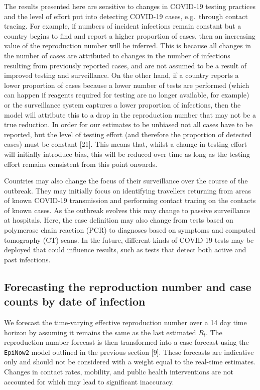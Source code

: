 \documentclass[
]{article}
\begin{document}
The results presented here are sensitive to changes in COVID-19 testing
practices and the level of effort put into detecting COVID-19 cases,
e.g.~through contact tracing. For example, if numbers of incident
infections remain constant but a country begins to find and report a
higher proportion of cases, then an increasing value of the reproduction
number will be inferred. This is because all changes in the number of
cases are attributed to changes in the number of infections resulting
from previously reported cases, and are not assumed to be a result of
improved testing and surveillance. On the other hand, if a country
reports a lower proportion of cases because a lower number of tests are
performed (which can happen if reagents required for testing are no
longer available, for example) or the surveillance system captures a
lower proportion of infections, then the model will attribute this to a
drop in the reproduction number that may not be a true reduction. In
order for our estimates to be unbiased not all cases have to be
reported, but the level of testing effort (and therefore the proportion
of detected cases) must be constant {[}21{]}. This means that, whilst a
change in testing effort will initially introduce bias, this will be
reduced over time as long as the testing effort remains consistent from
this point onwards.

Countries may also change the focus of their surveillance over the
course of the outbreak. They may initially focus on identifying
travellers returning from areas of known COVID-19 transmission and
performing contact tracing on the contacts of known cases. As the
outbreak evolves this may change to passive surveillance at hospitals.
Here, the case definition may also change from tests based on polymerase
chain reaction (PCR) to diagnoses based on symptoms and computed
tomography (CT) scans. In the future, different kinds of COVID-19 tests
may be deployed that could influence results, such as tests that detect
both active and past infections.

\hypertarget{forecasting-the-reproduction-number-and-case-counts-by-date-of-infection}{%
\subsection{Forecasting the reproduction number and case counts by date
of
infection}\label{forecasting-the-reproduction-number-and-case-counts-by-date-of-infection}}

We forecast the time-varying effective reproduction number over a 14 day
time horizon by assuming it remains the same as the last estimated
\(R_t\). The reproduction number forecast is then transformed into a
case forecast using the \texttt{EpiNow2} model outlined in the previous
section {[}9{]}. These forecasts are indicative only and should not be
considered with a weight equal to the real-time estimates. Changes in
contact rates, mobility, and public health interventions are not
accounted for which may lead to significant inaccuracy.
\end{document}
